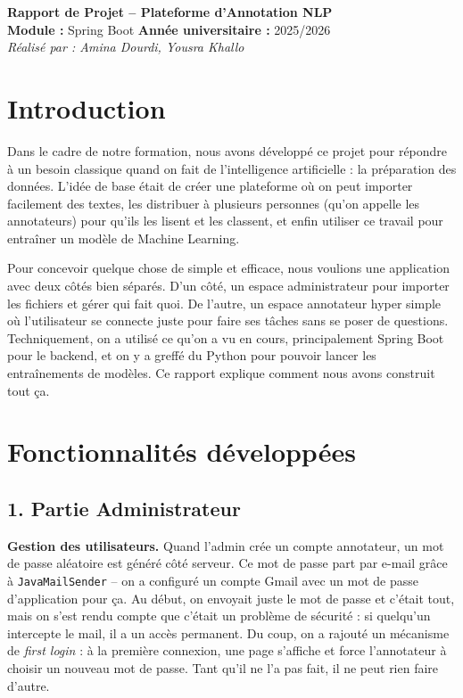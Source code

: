 \documentclass[11pt,a4paper]{article}
\begin{document}
\begin{center}
    {\LARGE \bfseries Rapport de Projet -- Plateforme d'Annotation NLP}\\[0.5cm]
    {\large \textbf{Module :} Spring Boot \hfill \textbf{Année universitaire :} 2025/2026}\\[0.2cm]
    {\textit{Réalisé par : Amina Dourdi, Yousra Khallo}}\\[0.8cm]
\end{center}

\section*{Introduction}

Dans le cadre de notre formation, nous avons développé ce projet pour répondre à un besoin classique quand on fait de l'intelligence artificielle : la préparation des données. L'idée de base était de créer une plateforme où on peut importer facilement des textes, les distribuer à plusieurs personnes (qu'on appelle les annotateurs) pour qu'ils les lisent et les classent, et enfin utiliser ce travail pour entraîner un modèle de Machine Learning.

Pour concevoir quelque chose de simple et efficace, nous voulions une application avec deux côtés bien séparés. D'un côté, un espace administrateur pour importer les fichiers et gérer qui fait quoi. De l'autre, un espace annotateur hyper simple où l'utilisateur se connecte juste pour faire ses tâches sans se poser de questions. Techniquement, on a utilisé ce qu'on a vu en cours, principalement Spring Boot pour le backend, et on y a greffé du Python pour pouvoir lancer les entraînements de modèles. Ce rapport explique comment nous avons construit tout ça.

\section{Fonctionnalités développées}

\subsection{1. Partie Administrateur}

\textbf{Gestion des utilisateurs.} Quand l'admin crée un compte annotateur, un mot de passe aléatoire est généré côté serveur. Ce mot de passe part par e-mail grâce à \texttt{JavaMailSender} -- on a configuré un compte Gmail avec un mot de passe d'application pour ça. Au début, on envoyait juste le mot de passe et c'était tout, mais on s'est rendu compte que c'était un problème de sécurité : si quelqu'un intercepte le mail, il a un accès permanent. Du coup, on a rajouté un mécanisme de \textit{first login} : à la première connexion, une page s'affiche et force l'annotateur à choisir un nouveau mot de passe. Tant qu'il ne l'a pas fait, il ne peut rien faire d'autre.
\end{document}
